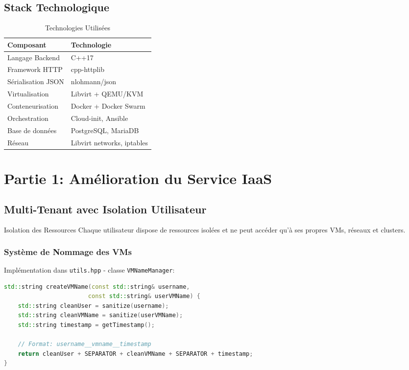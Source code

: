 \documentclass[12pt,a4paper]{article}
\begin{document}
\subsection{Stack Technologique}

\begin{table}[H]
\centering
\begin{tabular}{@{}ll@{}}
\toprule
\textbf{\color{primaryBlue}Composant} & \textbf{\color{secondaryGreen}Technologie} \\
\midrule
Langage Backend & C++17 \\
Framework HTTP & cpp-httplib \\
Sérialisation JSON & nlohmann/json \\
Virtualisation & Libvirt + QEMU/KVM \\
Conteneurisation & Docker + Docker Swarm \\
Orchestration & Cloud-init, Ansible \\
Base de données & PostgreSQL, MariaDB \\
Réseau & Libvirt networks, iptables \\
\bottomrule
\end{tabular}
\caption{Technologies Utilisées}
\end{table}

\section{Partie 1: Amélioration du Service IaaS}

\subsection{Multi-Tenant avec Isolation Utilisateur}

\begin{successbox}{Isolation des Ressources}
Chaque utilisateur dispose de ressources isolées et ne peut accéder qu'à ses propres VMs, réseaux et clusters.
\end{successbox}

\subsubsection{Système de Nommage des VMs}

Implémentation dans \texttt{utils.hpp} - classe \texttt{VMNameManager}:

\begin{lstlisting}[language=C++, caption=Génération de noms de VMs uniques]
std::string createVMName(const std::string& username, 
                        const std::string& userVMName) {
    std::string cleanUser = sanitize(username);
    std::string cleanVMName = sanitize(userVMName);
    std::string timestamp = getTimestamp();
    
    // Format: username__vmname__timestamp
    return cleanUser + SEPARATOR + cleanVMName + SEPARATOR + timestamp;
}
\end{lstlisting}
\end{document}
